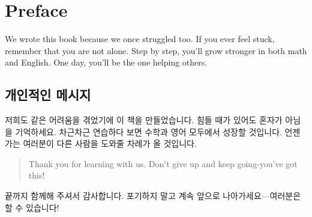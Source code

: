 \newpage
\section*{Preface}
We wrote this book because we once struggled too. If you ever feel stuck, remember that you are not alone. Step by step, you'll grow stronger in both math and English. One day, you'll be the one helping others.



\subsection*{개인적인 메시지}
저희도 같은 어려움을 겪었기에 이 책을 만들었습니다. 힘들 때가 있어도 혼자가 아님을 기억하세요. 차근차근 연습하다 보면 수학과 영어 모두에서 성장할 것입니다. 언젠가는 여러분이 다른 사람을 도와줄 차례가 올 것입니다.

\blockquote{Thank you for learning with us. Don't give up and keep going-you've got this!} 

끝까지 함께해 주셔서 감사합니다. 포기하지 말고 계속 앞으로 나아가세요—여러분은 할 수 있습니다!